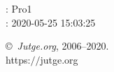 \documentclass[11pt]{article}
\begin{document}
    \newcommand{\SampleTwoCol}{\SampleTwoColInputOutput{sample-000}{1}\SampleTwoColInputOutput{sample-001}{2}}
    \newcommand{\SampleOneCol}{\SampleOneColInputOutput{sample-000}{1}\SampleOneColInputOutput{sample-001}{2}}

    \ProblemInformation
    \Author: Pro1\\    
    \Generation: 2020-05-25 15:03:25

    \bigskip

    \copyright\ \emph{Jutge.org}, 2006--2020. \\
    https:$/\!\!/$jutge.org
\end{document}
